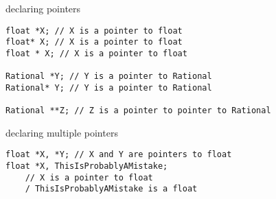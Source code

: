 \begin{frame}[fragile,label=pointerDeclare]{declaring pointers}
\lstset{
    language=C++,
    style=smaller,
    morekeywords=Rational,
}
\begin{lstlisting}
float *X; // X is a pointer to float
float* X; // X is a pointer to float
float * X; // X is a pointer to float

Rational *Y; // Y is a pointer to Rational
Rational* Y; // Y is a pointer to Rational

Rational **Z; // Z is a pointer to pointer to Rational
\end{lstlisting}
\end{frame}

\begin{frame}[fragile,label=pointerDeclareMult]{declaring multiple pointers}
\lstset{
    language=C++,
    style=smaller,
    morekeywords=Rational,
}
\begin{lstlisting}
float *X, *Y; // X and Y are pointers to float
float *X, ThisIsProbablyAMistake;
    // X is a pointer to float
    / ThisIsProbablyAMistake is a float
\end{lstlisting}
\end{frame}

